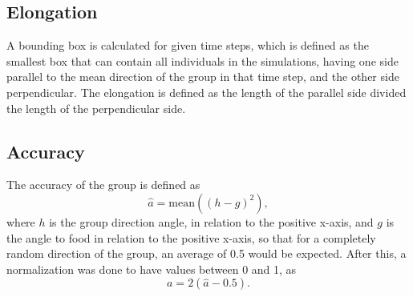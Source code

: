 \subsection{Elongation} %
\label{sub:elongation}
A bounding box is calculated for given time steps, which is defined as the smallest box that can contain all individuals in the simulations, having one side parallel to the mean direction of the group in that time step, and the other side perpendicular.
The elongation is defined as the length of the parallel side divided the length of the perpendicular side.

\subsection{Accuracy} %
\label{sub:accuracy}
The accuracy of the group is defined as 
\begin{equation}
	\hat{a} = \text{mean} ((h - g)^2),
\end{equation}
where $h$ is the group direction angle, in relation to the positive x-axis, and $g$ is the angle to food in relation to the positive x-axis, so that for a completely random direction of the group, an average of 0.5 would be expected. After this, a normalization was done to have values between 0 and 1, as
\begin{equation}
	a = 2(\hat{a} - 0.5).
\end{equation}
